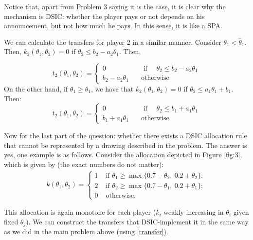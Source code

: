 \documentclass[a4paper]{article}
\begin{document}
Notice that, apart from Problem 3 saying it is the case, it is clear why the mechanism is DSIC: whether the player pays or not depends on his announcement, but not how much he pays. In this sense, it is like a SPA.

We can calculate the transfers for player 2 in a similar manner. Consider $\theta_1<\hat{\theta}_1$. Then, $k_2(\theta_1,\theta_2)=0$ if $\theta_2\leq b_2-a_2 \theta_1$. Then,

\[t_2(\theta_1,\theta_2)=\left\{\begin{array}{cc} 0 & \quad\text{ if }\quad  \theta_2\leq b_2-a_2 \theta_1\\
	b_2-a_2 \theta_1 & \quad\text{otherwise}\quad
	
\end{array}
\right.
\]
On the other hand, if $\theta_1\geq\hat{\theta}_1$, we have that $k_2(\theta_1,\theta_2)=0$ if $\theta_2\leq a_1\theta_1+b_1$. Then:
\[t_2(\theta_1,\theta_2)=\left\{\begin{array}{cc} 0 & \quad\text{ if }\quad  \theta_2\leq b_1+a_1 \theta_1\\
	b_1+a_1 \theta_1 & \quad\text{otherwise}\quad
	
\end{array}
\right.
\]



Now for the last part of the question: whether there exists a DSIC allocation rule that cannot be represented by a drawing described in the problem. The answer is yes, one example is as follows.
Consider the allocation depicted in Figure \ref{fig:3}, which is given by (the exact numbers do not matter):
\begin{align*}
	k(\theta_1,\theta_2) = \begin{cases}
		1 & \text{ if } \theta_1 \geq \max\{ 0.7 - \theta_2, \ 0.2 + \theta_2 \};
		\\
		2 & \text{ if } \theta_2 \geq \max\{ 0.7 - \theta_1, \ 0.2 + \theta_1 \};
		\\
		0 & \text{ otherwise.}
	\end{cases}
\end{align*}

This allocation is again monotone for each player ($k_i$ weakly increasing in $\theta_i$ given fixed $\theta_j$). We can construct the transfers that DSIC-implement it in the same way as we did in the main problem above (using \eqref{transfer}).
\end{document}
